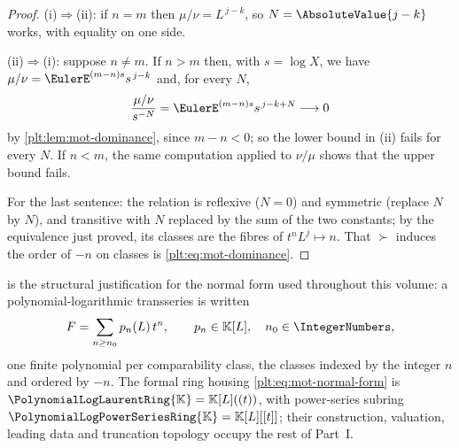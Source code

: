 \documentclass[11pt,oneside]{article}
\theoremstyle{plain}
\theoremstyle{definition}
\theoremstyle{remark}
\newcommand{\K}{\mathbb{K}}
\newcommand{\PLpow}{\PolynomialLogPowerSeriesRing{\K}}   %
\newcommand{\PLlau}{\PolynomialLogLaurentRing{\K}}       %
\newcommand{\succdom}{\succ}
\begin{document}
\begin{proof}
(i)\(\Rightarrow\)(ii): if \(n=m\) then \(\mu/\nu=L^{\,j-k}\), so
\(N=\AbsoluteValue{j-k}\) works, with equality on one side.

(ii)\(\Rightarrow\)(i): suppose \(n\ne m\).  If \(n>m\) then, with
\(s=\log X\), we have \(\mu/\nu=\EulerE^{(m-n)s}s^{\,j-k}\) and, for every
\(N\),
\[
  \frac{\mu/\nu}{s^{-N}}=\EulerE^{(m-n)s}s^{\,j-k+N}\longrightarrow0
\]
by \cref{plt:lem:mot-dominance}, since \(m-n<0\); so the lower bound in (ii)
fails for every \(N\).  If \(n<m\), the same computation applied to
\(\nu/\mu\) shows that the upper bound fails.

For the last sentence: the relation is reflexive (\(N=0\)) and symmetric
(replace \(N\) by \(N\)), and transitive with \(N\) replaced by the sum of the
two constants; by the equivalence just proved, its classes are the fibres of
\(t^{n}L^{j}\mapsto n\).  That \(\succdom\) induces the order of \(-n\) on
classes is \eqref{plt:eq:mot-dominance}.
\end{proof}

 is the structural justification for the normal form
used throughout this volume: a polynomial-logarithmic transseries is written
\begin{equation}\label{plt:eq:mot-normal-form}
  F=\sum_{n\ge n_{0}}p_{n}(L)\,t^{n},
  \qquad p_{n}\in\K[L],\quad n_{0}\in\IntegerNumbers,
\end{equation}
one finite polynomial per comparability class, the classes indexed by the
integer \(n\) and ordered by \(-n\).  The formal ring housing
\eqref{plt:eq:mot-normal-form} is \(\PLlau=\K[L]((t))\), with power-series
subring \(\PLpow=\K[L][[t]]\); their construction, valuation, leading data and
truncation topology occupy the rest of Part~I.
\end{document}
